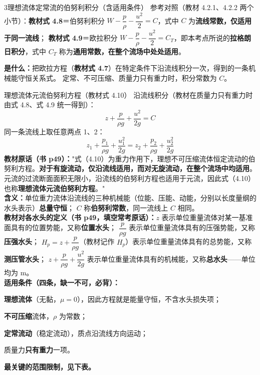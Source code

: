 \begin{kaodian}{3}{理想流体定常流的伯努利积分（含适用条件）}
参考对照（教材 4.2.1、4.2.2 两个小节）：\textbf{教材式 4.8}＝伯努利积分 $W-\dfrac{p}{\rho}-\dfrac{u^2}{2}=C$，式中 $C$ 为\textbf{流线常数，仅适用于同一流线}；
\textbf{教材式 4.9}＝欧拉积分 $W-\dfrac{p}{\rho}-\dfrac{u^2}{2}=C_T$，即本考点所说的\textbf{拉格朗日积分}，式中 $C_T$ 称为\textbf{通用常数，在整个流场中处处适用}。

\textbf{是什么：}把欧拉方程（\textbf{教材式 4.7}）在特定条件下沿流线积分一次，得到的一条机械能守恒关系式。
定常、不可压缩、质量力只有重力时，积分常数为 $C$。

\begin{gongshi}{理想流体元流伯努利方程（教材式 4.10）}
沿流线积分（教材在质量力只有重力时由式 4.8、式 4.9 统一得到）：
\[ z+\frac{p}{\rho g}+\frac{u^2}{2g}=C \]
同一条流线上取任意两点 1、2：
\[ z_1+\frac{p_1}{\rho g}+\frac{u_1^2}{2g}=z_2+\frac{p_2}{\rho g}+\frac{u_2^2}{2g} \]
\textbf{教材原话（书 p49）：}"式（4.10）为重力作用下，理想不可压缩流体恒定流动的伯努利方程。\textbf{对于有旋流动，仅沿流线适用，而对无旋流动，在整个流场中均适用}。
元流的过流断面面积无限小，沿流线的伯努利方程也适用于元流，因此式（4.10）也称\textbf{理想流体元流伯努利方程}。"\\
\textbf{含义：}单位重力流体沿流线的三种机械能（位能、压能、动能，分别以长度量纲的水头表示）\textbf{总量守恒}；
$C$ 称\textbf{伯努利常数}，同一流线上 $C$ 相同。\\
\textbf{教材对各水头的定义（书 p49，填空常考原话）：}$z$ 表示单位重量流体对某一基准面具有的位置势能，又称\textbf{位置水头}；
$\dfrac{p}{\rho g}$ 表示单位重量流体具有的压强势能，又称\textbf{压强水头}；
$H_p=z+\dfrac{p}{\rho g}$（教材记作 $H_p$）表示单位重量流体具有的总势能，又称\textbf{测压管水头}；
$z+\dfrac{p}{\rho g}+\dfrac{u^2}{2g}$ 表示单位重量流体具有的机械能，又称\textbf{总水头}——单位均为 m。\\
\textbf{适用条件（\textbf{四条，缺一不可}，必背）：}
\begin{xiaowen}
  \item \textbf{理想流体}（无黏，$\mu=0$），因此方程就是能量守恒，不含水头损失项；
  \item \textbf{不可压缩}流体，$\rho$ 为常数；
  \item \textbf{定常流动}（稳定流动），质点沿流线方向运动；
  \item 质量力\textbf{只有重力}一项。\\
\end{xiaowen}
\textbf{最关键的范围限制，见下表。}
\end{gongshi}


\end{kaodian}
